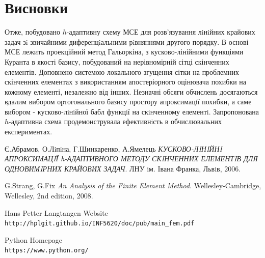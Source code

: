 \documentclass[a4paper]{article}
\numberwithin{equation}{section}
\begin{document}
\newpage
\section{Висновки}
Отже, побудовано $h$-адаптивну схему МСЕ для розв’язування лiнiйних крайових задач зi звичайни\-ми диференцiальними рiвняннями другого порядку. В основі МСЕ лежить проекційний метод Галь\-оркіна, з кусково-лінійними функціями Куранта в якості базису, побудований на нерівномірній сітці скінченних елементів. Доповнено системою локального згущення сітки на проблемних скінченних елементах з використанням апостеріорного оцінювача похибки на кожному елементі, незалежно від інших. Незначні обсяги обчислень досягаються вдалим вибором ортогонального базису простору апроксимацiї похибки, а саме
вибором - кусково-лiнiйної бабл функцiї на скiнченному елементi. Запропонована $h$-адаптивна схема продемонструвала ефективнiсть в обчислювальних експеримен\-тах.
\newpage
\begin{thebibliography}{9}
Є.Абрамов, О.Лiпiна, Г.Шинкаренко, А.Ямелець 
\textit{КУСКОВО-ЛIНIЙНI АПРОКСИМАЦIЇ h-АДАПТИВНОГО МЕТОДУ СКIНЧЕННИХ ЕЛЕМЕНТIВ ДЛЯ ОДНОВИМIРНИХ КРАЙОВИХ ЗАДАЧ}. 
ЛНУ iм. Iвана Франка, Львiв, 2006.
 
G.Strang, G.Fix
\textit{An Analysis of the Finite Element Method}. 
Wellesley-Cambridge, Wellesley, 2nd edition, 2008.

 
Hans Petter Langtangen Website
\\\texttt{http://hplgit.github.io/INF5620/doc/pub/main\_fem.pdf}

Python Homepage
\\\texttt{https://www.python.org/}


\end{thebibliography}
\end{document}
